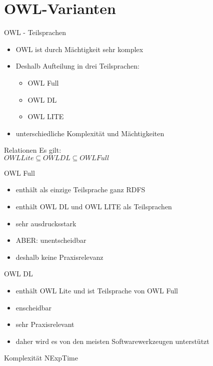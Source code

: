 \documentclass{beamer}
\begin{document}
\section{OWL-Varianten}
\begin{frame}{OWL - Teilsprachen}
\begin{itemize}
	\item OWL ist durch Mächtigkeit sehr komplex
	\item Deshalb Aufteilung in drei Teilsprachen:
\begin{itemize}
	\item OWL Full
	\item OWL DL
	\item OWL LITE
\end{itemize}
	\item unterschiedliche Komplexität und Mächtigkeiten
\end{itemize}
\begin{block}{Relationen}
	Es gilt:\\
	$OWL Lite \subseteq OWL DL \subseteq OWL Full$
\end{block}
\end{frame}

%
\begin{frame}{OWL Full}
\begin{itemize}
	\item enthält als einzige Teilsprache \alert{ganz} RDFS
	\item enthält OWL DL und OWL LITE als Teilsprachen
	\item sehr ausdrucksstark
	\item ABER: \alert{unentscheidbar}
	\item deshalb keine Praxisrelevanz
\end{itemize}
\end{frame}

%
\begin{frame}{OWL DL}
\begin{itemize}
	\item enthält OWL Lite und ist Teilsprache von OWL Full
	\item enscheidbar
	\item sehr Praxisrelevant
	\item daher wird es von den meisten Softwarewerkzeugen unterstützt
\end{itemize}
\begin{block}{Komplexität}
	NExpTime
\end{block}
\end{frame}
\end{document}
